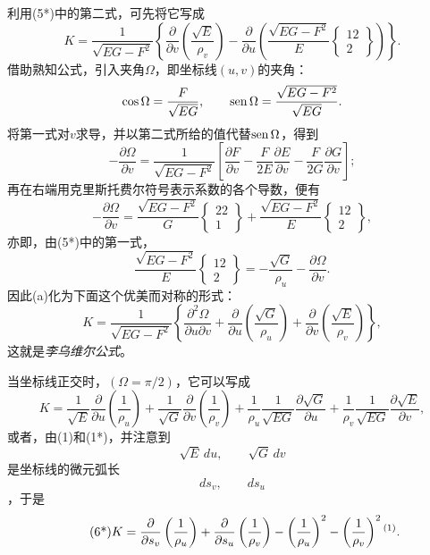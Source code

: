 利用(5*)中的第二式，可先将它写成
\begin{equation}\tag{a}
 K=\frac1{\sqrt{EG-F^2}}\left\{
 \frac{\partial}{\partial v}\left(\frac{\sqrt E}{\rho_v}\right)-
 \frac{\partial}{\partial u}\left(\frac{\sqrt{EG-F^2}}{E}\left\{\begin{matrix}12\\2\end{matrix}\right\}\right)\right\}.
\end{equation}
借助熟知公式，引入夹角\(\Omega\)，即坐标线\((u,v)\)的夹角：
\[
 \cos\Omega=\frac{F}{\sqrt{EG}},
  \qquad
 \operatorname{sen}\Omega=\frac{\sqrt{EG-F^2}}{\sqrt{EG}}.
\]
将第一式对\(v\)求导，并以第二式所给的值代替\(\operatorname{sen}\Omega\)，得到
\[
 -\frac{\partial\Omega}{\partial v}=\frac1{\sqrt{EG-F^2}}\left[\frac{\partial F}{\partial v}-\frac{F}{2E}\frac{\partial E}{\partial v}-\frac{F}{2G}\frac{\partial G}{\partial v}\right];
\]
再在右端用克里斯托费尔符号表示系数的各个导数，便有
\[
 -\frac{\partial\Omega}{\partial v}=\frac{\sqrt{EG-F^2}}{G}\left\{\begin{matrix}22\\1\end{matrix}\right\}+\frac{\sqrt{EG-F^2}}{E}\left\{\begin{matrix}12\\2\end{matrix}\right\},
\]
亦即，由(5*)中的第一式，
\[
 \frac{\sqrt{EG-F^2}}{E}\left\{\begin{matrix}12\\2\end{matrix}\right\}=-\frac{\sqrt G}{\rho_u}-\frac{\partial\Omega}{\partial v}.
\]
因此(a)化为下面这个优美而对称的形式：
\begin{equation}\tag{6}
 K=\frac1{\sqrt{EG-F^2}}\left\{
 \frac{\partial^2\Omega}{\partial u\partial v}
 +\frac{\partial}{\partial u}\left(\frac{\sqrt G}{\rho_u}\right)
 +\frac{\partial}{\partial v}\left(\frac{\sqrt E}{\rho_v}\right)\right\},
\end{equation}
这就是\emph{李乌维尔公式}。

当坐标线正交时，\((\Omega=\pi/2)\)，它可以写成
\[
 K=\frac1{\sqrt E}\frac{\partial}{\partial u}\left(\frac1{\rho_u}\right)+\frac1{\sqrt G}\frac{\partial}{\partial v}\left(\frac1{\rho_v}\right)+\frac1{\rho_u}\frac1{\sqrt{EG}}\frac{\partial\sqrt G}{\partial u}+\frac1{\rho_v}\frac1{\sqrt{EG}}\frac{\partial\sqrt E}{\partial v},
\]
或者，由(1)和(1*)，并注意到
\[
 \sqrt E\,du,
 \qquad
 \sqrt G\,dv
\]
是坐标线的微元弧长
\[
 ds_v,
 \qquad
 ds_u
\]
，于是
\begin{equation}\tag{6*}
 K=\frac{\partial}{\partial s_v}\left(\frac1{\rho_u}\right)+\frac{\partial}{\partial s_u}\left(\frac1{\rho_v}\right)-\left(\frac1{\rho_u}\right)^2-\left(\frac1{\rho_v}\right)^2\srcfnmark{1}.
\end{equation}

